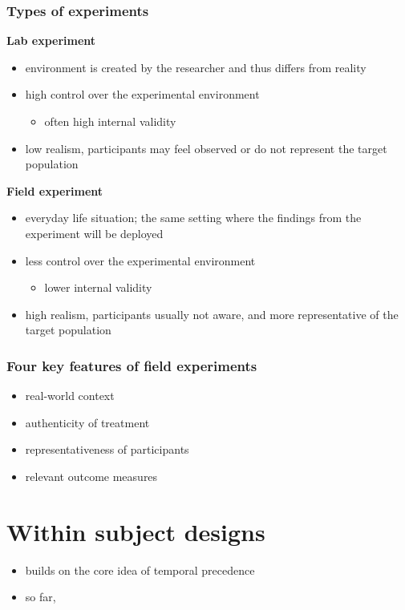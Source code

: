 \documentclass[10pt]{article}
\begin{document}
\subsubsection{Types of experiments}
\begin{minipage}[t][0.28\textheight][t]{0.48\textwidth}
    \textbf{Lab experiment}
    \begin{itemize}
        \item environment is created by the researcher and thus differs from reality
        \item high control over the experimental environment
        \begin{itemize}
            \item often high internal validity
        \end{itemize}
        \item low realism, participants may feel observed or do not represent the target population 
        \vfill
    \end{itemize}
    \end{minipage}
    \hfill
    \begin{minipage}[t][0.28\textheight][t]{0.48\textwidth}
    \textbf{Field experiment}
    \begin{itemize}
        \item everyday life situation; the same setting where the findings from the experiment will be deployed 
        \item less control over the experimental environment
        \begin{itemize}
            \item lower internal validity
        \end{itemize}
        \item high realism, participants usually not aware, and more representative of the target population
        \vfill
    \end{itemize}
    \end{minipage}
    \vspace{1em}
\subsubsection{Four key features of field experiments}
\begin{itemize}
    \item real-world context 
    \item authenticity of treatment
    \item representativeness of participants
    \item relevant outcome measures 
\end{itemize}
\newpage 
\section{Within subject designs}
\begin{itemize}
    \item builds on the core idea of temporal precedence
    \item so far, 
\end{itemize}
\end{document}
